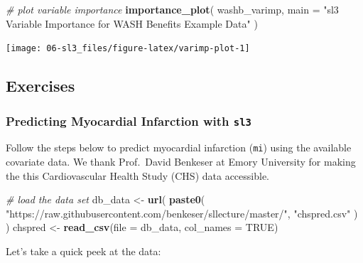 \documentclass[12pt, krantz2,]{krantz}
\newenvironment{Shaded}{\begin{snugshade}}{\end{snugshade}}
\newcommand{\CommentTok}[1]{\textcolor[rgb]{0.37,0.37,0.37}{\textit{#1}}}
\newcommand{\DataTypeTok}[1]{\textcolor[rgb]{0.27,0.27,0.27}{#1}}
\newcommand{\KeywordTok}[1]{\textcolor[rgb]{0.27,0.27,0.27}{\textbf{#1}}}
\newcommand{\NormalTok}[1]{#1}
\newcommand{\OtherTok}[1]{\textcolor[rgb]{0.37,0.37,0.37}{#1}}
\newcommand{\StringTok}[1]{\textcolor[rgb]{0.5,0.5,0.5}{#1}}
\theoremstyle{definition}
\theoremstyle{definition}
\theoremstyle{definition}
\newcommand{\1}{\mathbbm{1}}
\begin{document}
\begin{Shaded}
\begin{Highlighting}[]
\CommentTok{# plot variable importance}
\KeywordTok{importance_plot}\NormalTok{(}
\NormalTok{  washb_varimp,}
  \DataTypeTok{main =} \StringTok{"sl3 Variable Importance for WASH Benefits Example Data"}
\NormalTok{)}
\end{Highlighting}
\end{Shaded}

\begin{center}\texttt{[image: 06-sl3\_files/figure-latex/varimp-plot-1]} \end{center}

\hypertarget{sl3-exercises}{%
\subsection{Exercises}\label{sl3-exercises}}

\hypertarget{sl3ex1}{%
\subsubsection{\texorpdfstring{Predicting Myocardial Infarction with \texttt{sl3}}{Predicting Myocardial Infarction with sl3}}\label{sl3ex1}}

Follow the steps below to predict myocardial infarction (\texttt{mi}) using the
available covariate data. We thank Prof.~David Benkeser at Emory University for
making the this Cardiovascular Health Study (CHS) data accessible.

\begin{Shaded}
\begin{Highlighting}[]
\CommentTok{# load the data set}
\NormalTok{db_data <-}\StringTok{ }\KeywordTok{url}\NormalTok{(}
  \KeywordTok{paste0}\NormalTok{(}
    \StringTok{"https://raw.githubusercontent.com/benkeser/sllecture/master/"}\NormalTok{,}
    \StringTok{"chspred.csv"}
\NormalTok{  )}
\NormalTok{)}
\NormalTok{chspred <-}\StringTok{ }\KeywordTok{read_csv}\NormalTok{(}\DataTypeTok{file =}\NormalTok{ db_data, }\DataTypeTok{col_names =} \OtherTok{TRUE}\NormalTok{)}
\end{Highlighting}
\end{Shaded}

Let's take a quick peek at the data:
\end{document}
